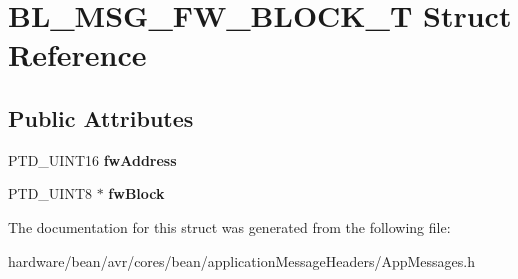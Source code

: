 \hypertarget{struct_b_l___m_s_g___f_w___b_l_o_c_k___t}{}\section{B\+L\+\_\+\+M\+S\+G\+\_\+\+F\+W\+\_\+\+B\+L\+O\+C\+K\+\_\+T Struct Reference}
\label{struct_b_l___m_s_g___f_w___b_l_o_c_k___t}
\subsection*{Public Attributes}
\begin{DoxyCompactItemize}
\item 
P\+T\+D\+\_\+\+U\+I\+N\+T16 {\bfseries fw\+Address}\hypertarget{struct_b_l___m_s_g___f_w___b_l_o_c_k___t_a95eebace63ad93ca6385a32410a589ce}{}\label{struct_b_l___m_s_g___f_w___b_l_o_c_k___t_a95eebace63ad93ca6385a32410a589ce}

\item 
P\+T\+D\+\_\+\+U\+I\+N\+T8 $\ast$ {\bfseries fw\+Block}\hypertarget{struct_b_l___m_s_g___f_w___b_l_o_c_k___t_ae0a2a8428f4091045c5cb0702cf805e5}{}\label{struct_b_l___m_s_g___f_w___b_l_o_c_k___t_ae0a2a8428f4091045c5cb0702cf805e5}

\end{DoxyCompactItemize}


The documentation for this struct was generated from the following file\+:\begin{DoxyCompactItemize}
\item 
hardware/bean/avr/cores/bean/application\+Message\+Headers/App\+Messages.\+h\end{DoxyCompactItemize}
